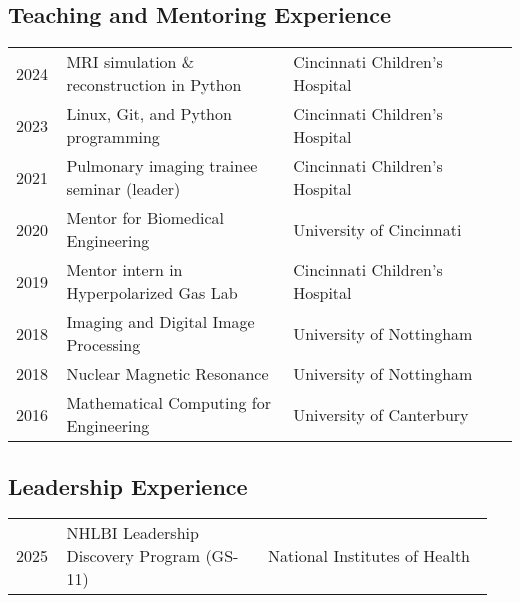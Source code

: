 \documentclass[12pt,]{scrartcl}
\begin{document}
\subsection{Teaching and Mentoring Experience}\label{teaching}

\begin{table}[!h]
{\def\arraystretch{1.5}\tabcolsep=0pt
\begin{tabular}{p{0.10\linewidth}p{0.45\linewidth}p{0.45\linewidth}}

2024 & MRI simulation \& reconstruction in Python & Cincinnati Children's Hospital \\

2023 & Linux, Git, and Python programming & Cincinnati Children's Hospital \\

2021 & Pulmonary imaging trainee seminar (leader) & Cincinnati Children's Hospital\\

2020 & Mentor for Biomedical Engineering & University of Cincinnati\\

 2019 & Mentor intern in Hyperpolarized Gas Lab & Cincinnati Children's Hospital\\
  
  2018 & Imaging and Digital Image Processing & University of Nottingham \\
  
  2018 & Nuclear Magnetic Resonance & University of Nottingham  \\

 2016 & Mathematical Computing for Engineering & University of Canterbury  \\
  
\end{tabular}%
}
\end{table}


\subsection{Leadership Experience}\label{leadership}

\begin{table}[!h]
{\def\arraystretch{1.5}\tabcolsep=5pt
\begin{tabular}{p{0.10\linewidth}p{0.4\linewidth}p{0.45\linewidth}}

2025 & NHLBI Leadership Discovery Program (GS-11) & National Institutes of Health \\

\end{tabular}%
}
\end{table}
\end{document}
